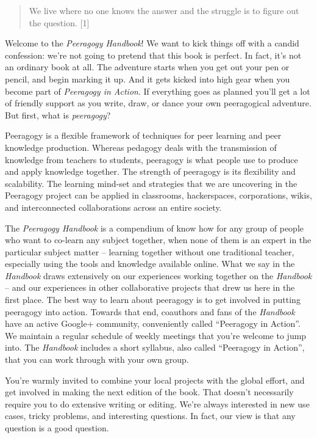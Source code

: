 \begin{quote}
We live where no one knows the answer and the struggle is to figure out
the question. {[}1{]}
\end{quote}

Welcome to the \emph{Peeragogy Handbook}! We want to kick things off
with a candid confession: we're not going to pretend that this book is
perfect. In fact, it's not an ordinary book at all. The adventure starts
when you get out your pen or pencil, and begin marking it up. And it
gets kicked into high gear when you become part of
\emph{Peeragogy in Action}.
If everything goes as planned you'll get a lot of friendly support as
you write, draw, or dance your own peeragogical adventure. But first,
what is \emph{peeragogy}?

Peeragogy is a flexible framework of techniques for peer learning and
peer knowledge production. Whereas pedagogy deals with the transmission
of knowledge from teachers to students, peeragogy is what people use to
produce and apply knowledge together. The strength of peeragogy is its
flexibility and scalability. The learning mind-set and strategies that
we are uncovering in the Peeragogy project can be applied in classrooms,
hackerspaces, corporations, wikis, and interconnected collaborations
across an entire society.

The \emph{Peeragogy Handbook} is a compendium of know how for any group
of people who want to co-learn any subject together, when none of them
is an expert in the particular subject matter -- learning together
without one traditional teacher, especially using the tools and
knowledge available online. What we say in the \emph{Handbook} draws
extensively on our experiences working together on the \emph{Handbook}
-- and our experiences in other collaborative projects that drew us here
in the first place. The best way to learn about peeragogy is to get
involved in putting peeragogy into action. Towards that end, coauthors
and fans of the \emph{Handbook} have an active Google+ community,
conveniently called ``Peeragogy in Action''. We maintain a regular
schedule of weekly meetings that you're welcome to jump into. The
\emph{Handbook} includes a short syllabus, also called ``Peeragogy in
Action'', that you can work through with your own group.

You're warmly invited to combine your local projects with the global
effort, and get involved in making the next edition of the book. That
doesn't necessarily require you to do extensive writing or editing.
We're always interested in new use cases, tricky problems, and
interesting questions. In fact, our view is that any question is a good
question.

